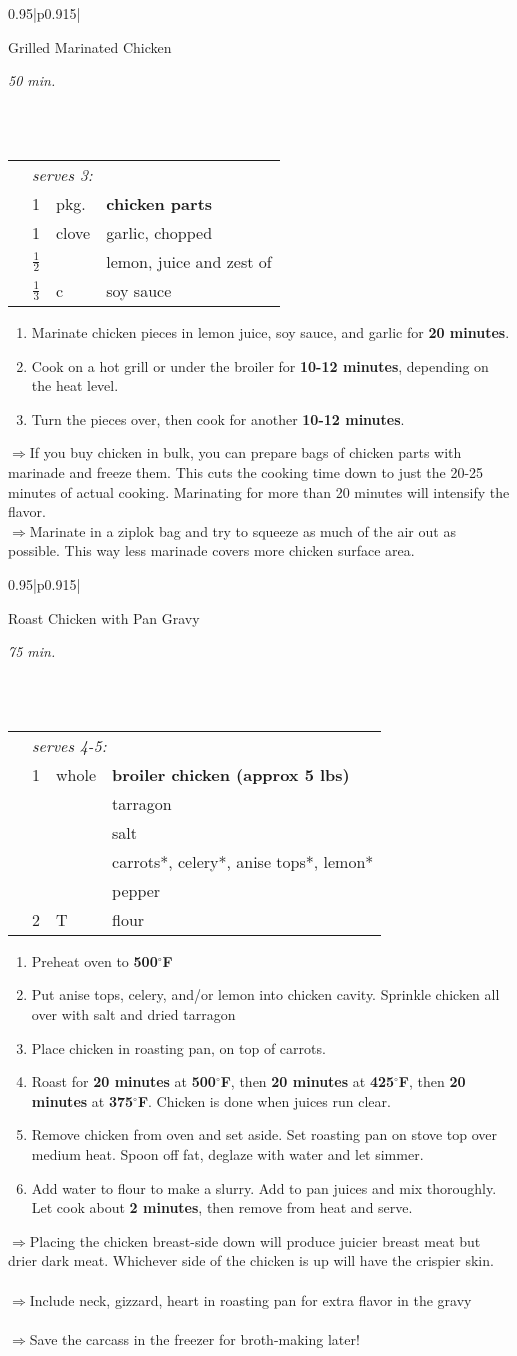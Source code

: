 \documentclass[8pt]{report}
\newcommand{\ingredmargin}{0.25cm}
\newcommand{\F}{$^\circ$F}
\newenvironment{recipe}[3]
  {\bigskip \bigskip 
\begin{tabular*}{0.95\textwidth}{|p{0.915\textwidth}|} \hline \vspace{0.25mm}
\begin{minipage}{0.7\textwidth}	\begin{flushleft} {\Large \textsf{#1}} \end{flushleft} \end{minipage}
\begin{minipage}{0.2\textwidth} \begin{flushright} \emph{#2} \end{flushright} \end{minipage} \\ \\ \hline
\begin{ingreds}{#3} \addcontentsline{toc}{section}{#1} \phantomsection \label{rec:#1}} 
  {\\ \hline \end{tabular*} \noindent}
\newenvironment{ingreds}[1]
  {\begin{tabular}{lrlp{0.6\textwidth}} \hspace{\ingredmargin} & \multicolumn{3}{l}{\it #1:} \\}
  {\end{tabular} \medskip}
\newcommand{\ingredsdone}{\end{ingreds}\begin{enumerate}}
\newcommand{\stepsdone}{\end{enumerate} \medskip}
\newcommand{\ingredient}[3]{\hspace{\ingredmargin} & #1 & #2 & #3 \\}
\newcommand{\tip}{$\Rightarrow$}
\begin{document}

\begin{recipe}{Grilled Marinated Chicken}{50 min.}{serves 3}
\index{chicken!marinated}
\ingredient{1}{pkg.}{\bf chicken parts}
\ingredient{1}{clove}{garlic, chopped}
\ingredient{$\frac12$}{}{lemon, juice and zest of}
\ingredient{$\frac13$}{c}{soy sauce}
\ingredsdone
\item Marinate chicken pieces in lemon juice, soy sauce, and garlic for {\bf 20 minutes}.
\item Cook on a hot grill or under the broiler for {\bf 10-12 minutes}, depending on the heat level.  
\item Turn the pieces over, then cook for another {\bf 10-12 minutes}.
\stepsdone
\noindent \tip If you buy chicken in bulk, you can prepare bags of chicken parts with marinade and freeze them.  This cuts the cooking time down to just the 20-25 minutes of actual cooking.  Marinating for more than 20 minutes will intensify the flavor.\\
\tip Marinate in a ziplok bag and try to squeeze as much of the air out as possible.  This way less marinade covers more chicken surface area.
\end{recipe}

\begin{recipe}{Roast Chicken with Pan Gravy}{75 min.}{serves 4-5}
\index{chicken!roast}
\ingredient{1}{whole}{\bf broiler chicken (approx 5 lbs)}
\ingredient{}{}{tarragon}
\ingredient{}{}{salt}
\ingredient{}{}{carrots*, celery*, anise tops*, lemon*}
\ingredient{}{}{pepper}
\ingredient{2}{T}{flour}
\ingredsdone
\item Preheat oven to {\bf 500\F}
\item Put anise tops, celery, and/or lemon into chicken cavity.  Sprinkle chicken all over with salt and dried tarragon
\item Place chicken in roasting pan, on top of carrots.
\item Roast for {\bf 20 minutes} at {\bf 500\F}, then {\bf 20 minutes} at {\bf 425\F}, then {\bf 20 minutes} at {\bf 375\F}.  Chicken is done when juices run clear.
\item Remove chicken from oven and set aside.  Set roasting pan on stove top over medium heat.  Spoon off fat, deglaze with water and let simmer.
\item Add water to flour to make a slurry.  Add to pan juices and mix thoroughly.  Let cook about {\bf 2 minutes}, then remove from heat and serve.
\stepsdone
\noindent \tip Placing the chicken breast-side down will produce juicier breast meat but drier dark meat.  Whichever side of the chicken is up will have the crispier skin.\\
\\
\tip Include neck, gizzard, heart in roasting pan for extra flavor in the gravy\\
\\
\tip Save the carcass in the freezer for broth-making later!
\end{recipe}
\end{document}
